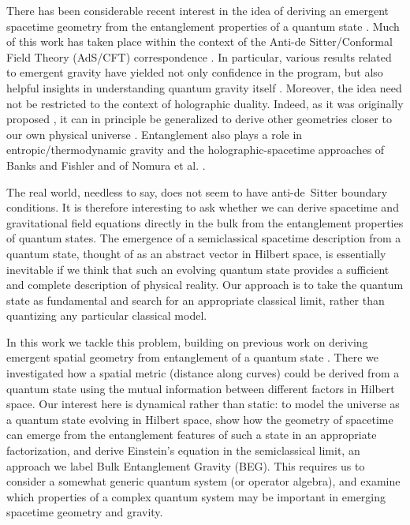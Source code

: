 \documentclass[%
12pt,preprint,
nofootinbib,
amsmath,amssymb,
aps,
prd,
showpacs,
superscriptaddress
]{revtex4-2}
\begin{document}
There has been considerable recent interest in the idea of deriving an emergent spacetime geometry from the entanglement properties of a quantum state \cite{Swingle:2009bg,VanRaamsdonk:2010pw,TNSGeo,Faulkner:2013ica,Faulkner:2017tkh,Czech:2015kbp}.
Much of this work has taken place within the context of the Anti-de Sitter/Conformal Field Theory (AdS/CFT) correspondence \cite{Maldacena:1997re}. In particular, various results related to emergent gravity  \cite{Faulkner:2013ica,Swingle:2014uza,Faulkner:2017tkh} have yielded not only confidence in the program, but also helpful insights in understanding quantum gravity itself  \cite{Maldacena:2013xja,Sanches:2016sxy}. Moreover, the idea need not be restricted to the context of holographic duality. Indeed, as it was originally proposed  \cite{VanRaamsdonk:2010pw}, it can in principle be generalized to derive other geometries closer to our own physical universe \cite{Susskind:2014moa,Cao:2016mst,Bao:2017iye,Bao:2017qmt,Susskind:2017ney}. Entanglement also plays a role in entropic/thermodynamic gravity \cite{Jacobson:1995ab,Padmanabhan:2009vy,Verlinde:2010hp,Jacobson:2015hqa,Carroll:2016lku,Verlinde:2016toy} and the holographic-spacetime approaches of Banks and Fishler \cite{Banks:2010tj,Banks:2011av,Banks:2015iya} and of Nomura et al. \cite{Nomura:2016aww,Nomura:2016ikr}.

The real world, needless to say, does not seem to have anti-de~Sitter boundary conditions.
It is therefore interesting to ask whether we can derive spacetime and gravitational field equations directly in the bulk from the entanglement properties of quantum states. 
The emergence of a semiclassical spacetime description from a quantum state, thought of as an abstract vector in Hilbert space, is essentially inevitable if we think that such an evolving quantum state provides a sufficient and complete description of physical reality.
Our approach is to take the quantum state as fundamental and search for an appropriate classical limit, rather than quantizing any particular classical model.

In this work we tackle this problem, building on previous work on deriving emergent spatial geometry from entanglement of a quantum state \cite{Cao:2016mst}.
There we investigated how a spatial metric (distance along curves) could be derived from a quantum state using the mutual information between different factors in Hilbert space.
Our interest here is dynamical rather than static: to model the universe as a quantum state evolving in Hilbert space, show how the geometry of spacetime can emerge from the entanglement features of such a state in an appropriate factorization, and derive Einstein's equation in the semiclassical limit, an approach we label Bulk Entanglement Gravity (BEG).
This requires us to consider a somewhat generic quantum system (or operator algebra), and examine which properties of a complex quantum system may be important in emerging spacetime geometry and gravity.
\end{document}

